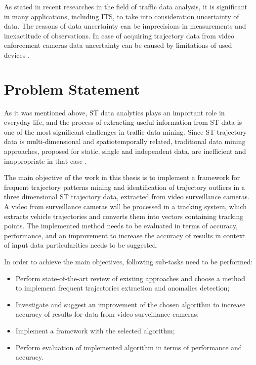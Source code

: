 As stated in recent researches in the field of traffic data analysis, it is significant in many applications, including ITS, to take into consideration uncertainty of data. The reasons of data uncertainty can be imprecisions in measurements and inexactitude of observations. In case of acquiring trajectory data from video enforcement cameras data uncertainty can be caused by limitations of used devices \cite{inproceedings:14_mpfstsp_gp_ud}.

\section{Problem Statement}

As it was mentioned above, ST data analytics plays an important role in everyday life, and the process of extracting useful information from ST data is one of the most significant challenges in traffic data mining. Since ST trajectory data is multi-dimensional and spatiotemporally related, traditional data mining approaches, proposed for static, single and independent data, are inefficient and inappropriate in that case \cite{article:8_review_mot_cl_alg}.

The main objective of the work in this thesis is to implement a framework for frequent trajectory patterns mining and identification of trajectory outliers in a three dimensional ST trajectory data, extracted from video surveillance cameras. A video from surveillance cameras will be processed in a tracking system, which extracts vehicle trajectories and converts them into vectors containing tracking points. The implemented method needs to be evaluated in terms of accuracy, performance, and an improvement to increase the accuracy of results in context of input data particularities needs to be suggested. 

In order to achieve the main objectives, following sub-tasks need to be performed:
\begin{itemize}
	\item Perform state-of-the-art review of existing approaches and choose a method to implement frequent trajectories extraction and anomalies detection;
	\item Investigate and suggest an improvement of the chosen algorithm to increase accuracy of results for data from video surveillance cameras;
	\item Implement a framework with the selected algorithm;
	\item Perform evaluation of implemented algorithm in terms of performance and accuracy.
\end{itemize}

